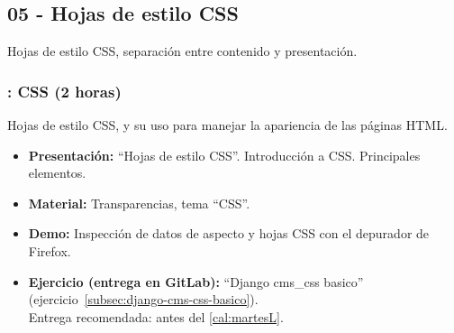 \documentclass[a4paper,12pt]{article}
\begin{document}
%
%
%
%
\subsection{05 - Hojas de estilo CSS}

Hojas de estilo CSS, separación entre contenido y presentación.

\subsubsection{\martesK: CSS (2 horas)}
\label{cal:martesK}

Hojas de estilo CSS, y su uso para manejar la apariencia de las páginas HTML.

\begin{itemize}
\item \textbf{Presentación:} ``Hojas de estilo CSS''. Introducción a CSS. Principales elementos.
 \item \textbf{Material:} Transparencias, tema ``CSS''.
\item \textbf{Demo:} Inspección de datos de aspecto y hojas CSS con el depurador de Firefox.
\item \textbf{Ejercicio (entrega en GitLab):} ``Django cms\_css basico'' (ejercicio~\ref{subsec:django-cms-css-basico}). \\
  Entrega recomendada: antes del \ref{cal:martesL}.
\end{itemize}
\end{document}
